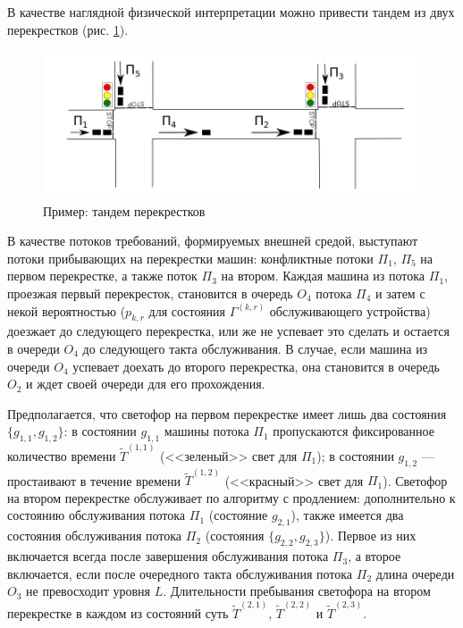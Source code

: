 \documentclass[a4paper,12pt,russian]{extarticle}
\newcommand{\ga}[1]{\Gamma^{\left( #1 \right)} }
\begin{document}
В качестве наглядной физической интерпретации можно привести тандем из двух перекрестков (рис. \ref{crossroads}).
\begin{figure}[h]
\includegraphics[scale=0.5]{Crossroads.png} 
\caption{Пример: тандем перекрестков}
\label{crossroads}
\end{figure}
В качестве потоков требований, формируемых внешней средой, выступают потоки прибывающих на перекрестки машин: конфликтные потоки $\Pi_1$, $\Pi_5$ на первом перекрестке, а также поток $\Pi_3$ на втором. Каждая машина из потока $\Pi_1$, проезжая первый перекресток, становится в очередь $O_4$ потока $\Pi_4$ и затем с некой вероятностью ($p_{k,r}$ для состояния $\ga{k,r}$ обслуживающего устройства) доезжает до следующего перекрестка, или же не успевает это сделать и остается в очереди $O_4$ до следующего такта обслуживания. В случае, если машина из очереди $O_4$ успевает доехать до второго перекрестка, она становится в очередь $O_2$ и ждет своей очереди для его прохождения.

Предполагается, что светофор на первом перекрестке имеет лишь два состояния $\{g_{1,1},g_{1,2}\}$: в состоянии $g_{1,1}$ машины потока $\Pi_1$ пропускаются фиксированное количество времени $\widetilde T^{(1,1)}$ (<<зеленый>> свет для $\Pi_1$); в состоянии $g_{1,2}$ --- простаивают в течение времени $\widetilde T^{(1,2)}$ (<<красный>> свет для $\Pi_1$). Светофор на втором перекрестке обслуживает по алгоритму с продлением: дополнительно к состоянию обслуживания потока $\Pi_1$ (состояние $g_{2,1}$), также имеется два состояния обслуживания потока $\Pi_2$ (состояния $\{g_{2,2},g_{2,3}\}$). Первое из них включается всегда после завершения обслуживания потока $\Pi_3$, а второе включается, если после очередного такта обслуживания потока $\Pi_2$ длина очереди $O_3$ не превосходит уровня $L$.
Длительности пребывания светофора на втором перекрестке в каждом из состояний суть $\widetilde T^{(2,1)}$, $\widetilde T^{(2,2)}$ и $\widetilde T^{(2,3)}$.

%
 
\end{document}
